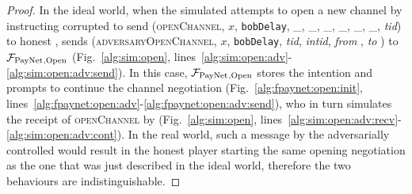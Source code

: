 \begin{proof}
  In the ideal world, when the simulated \adversary{} attempts to open a new
  channel by instructing corrupted \alice{} to send (\textsc{openChannel}, $x$,
  \texttt{bobDelay}, \_, \_, \_, \_, \_, \_, \textit{tid}) to honest \bob,
  \simulator{} sends (\textsc{adversaryOpenChannel}, $x$, \texttt{bobDelay},
  \textit{tid}, \textit{intid}, \textit{from} \alice, \textit{to} \bob) to
  $\mathcal{F}_{\mathrm{PayNet}}{}_{\mathrm{, Open}}$  (Fig.~\ref{alg:sim:open},
  lines~\ref{alg:sim:open:adv}-\ref{alg:sim:open:adv:send}). In this case,
  $\mathcal{F}_{\mathrm{PayNet}}{}_{\mathrm{, Open}}$ stores the intention and prompts \simulator{}
  to continue the channel negotiation (Fig.~\ref{alg:fpaynet:open:init},
  lines~\ref{alg:fpaynet:open:adv}-\ref{alg:fpaynet:open:adv:send}), who in turn
  simulates the receipt of \textsc{openChannel} by \bob{}
  (Fig.~\ref{alg:sim:open},
  lines~\ref{alg:sim:open:adv:recv}-\ref{alg:sim:open:adv:cont}). In the real
  world, such a message by the adversarially controlled \alice{} would result in
  the honest player \bob{} starting the same opening negotiation as the one that
  was just described in the ideal world, therefore the two behaviours are
  indistinguishable.


\end{proof}
